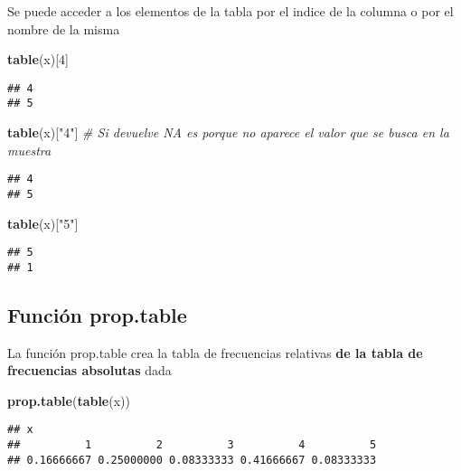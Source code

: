 \documentclass[]{article}
\newenvironment{Shaded}{\begin{snugshade}}{\end{snugshade}}
\newcommand{\CommentTok}[1]{\textcolor[rgb]{0.56,0.35,0.01}{\textit{#1}}}
\newcommand{\DecValTok}[1]{\textcolor[rgb]{0.00,0.00,0.81}{#1}}
\newcommand{\KeywordTok}[1]{\textcolor[rgb]{0.13,0.29,0.53}{\textbf{#1}}}
\newcommand{\NormalTok}[1]{#1}
\newcommand{\StringTok}[1]{\textcolor[rgb]{0.31,0.60,0.02}{#1}}
\begin{document}
Se puede acceder a los elementos de la tabla por el indice de la columna
o por el nombre de la misma

\begin{Shaded}
\begin{Highlighting}[]
\KeywordTok{table}\NormalTok{(x)[}\DecValTok{4}\NormalTok{]}
\end{Highlighting}
\end{Shaded}

\begin{verbatim}
## 4 
## 5
\end{verbatim}

\begin{Shaded}
\begin{Highlighting}[]
\KeywordTok{table}\NormalTok{(x)[}\StringTok{"4"}\NormalTok{] }\CommentTok{# Si devuelve NA es porque no aparece el valor que se busca en la muestra}
\end{Highlighting}
\end{Shaded}

\begin{verbatim}
## 4 
## 5
\end{verbatim}

\begin{Shaded}
\begin{Highlighting}[]
\KeywordTok{table}\NormalTok{(x)[}\StringTok{"5"}\NormalTok{]}
\end{Highlighting}
\end{Shaded}

\begin{verbatim}
## 5 
## 1
\end{verbatim}

\hypertarget{funcion-prop.table}{%
\subsection{Función prop.table}\label{funcion-prop.table}}

La función prop.table crea la tabla de frecuencias relativas \textbf{de
la tabla de frecuencias absolutas} dada

\begin{Shaded}
\begin{Highlighting}[]
\KeywordTok{prop.table}\NormalTok{(}\KeywordTok{table}\NormalTok{(x))}
\end{Highlighting}
\end{Shaded}

\begin{verbatim}
## x
##          1          2          3          4          5 
## 0.16666667 0.25000000 0.08333333 0.41666667 0.08333333
\end{verbatim}
\end{document}
